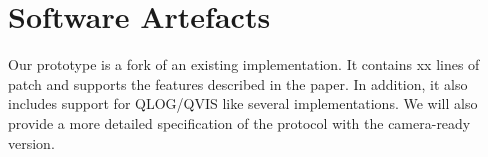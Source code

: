 %

\newpage
\section*{Software Artefacts}

Our \tcpls prototype is a fork of an existing  implementation. It contains xx lines of patch and supports the features described in the paper. In addition, it also includes support for QLOG/QVIS \cite{marx2020debugging} like several \quic implementations. We will also provide a more detailed specification of the \tcpls protocol with the camera-ready version.



